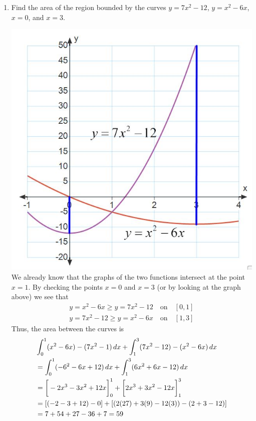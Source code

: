 \documentclass[noinstructornotes]{ximera}
\begin{document}
\begin{problem}
\begin{enumerate}
		
		\item  Find the area of the region bounded by the curves $y=7x^2-12$, $y=x^2-6x$, $x=0$, and $x=3$.
		\begin{freeResponse}
		\vspace{1mm}
			\includegraphics[scale=.5]{Figure6-2-3new.jpg}
		We already know that the graphs of the two functions intersect at the point $x=1$.  
		By checking the points $x=0$ and $x=3$ (or by looking at the graph above) we see that 
			\begin{align*}
			y=x^2-6x \geq y=7x^2-12 \quad \text{on} \quad [0,1]  \\
			y=7x^2-12 \geq y=x^2-6x \quad \text{on} \quad [1,3]
			\end{align*}
		Thus, the area between the curves is
			\begin{align*}
			&\int_0^1 (x^2-6x ) - (7x^2-1) \,d x + \int_1^3 (7x^2-12) - (x^2-6x) \,d x  \\
			&= \int_0^1 (-6^2 - 6x + 12) \,d x + \int_1^3 (6x^2 + 6x - 12) \,d x  \\
			&= \bigg[ -2 x^3 -3 x^2 + 12x \bigg]_0^1 + \bigg[ 2 x^3 + 3 x^2 - 12x \bigg]_1^3  \\
			&= \left[ \left(- 2 -3 + 12 \right) - 0 \right] + \left[ \left( 2 (27) +3 (9) - 12(3) \right) - \left(  2 +3 - 12 \right) \right]  \\
			&=  7+ 54 + 27 -36 +7 = 59
			\end{align*}
		\end{freeResponse}
		
	\end{enumerate}
	
\end{problem}
\end{document}
